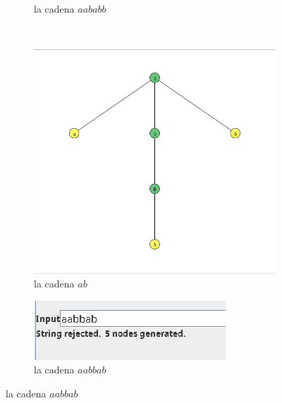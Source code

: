 \documentclass{article}
\begin{document}
\begin{flushleft}
\begin{enumerate}
\begin{figure}[h]
\begin{subfigure}[b]{0.4\textwidth}
                        \caption{la cadena $aababb$}
                        \label{fig:label6}
                    \end{subfigure}
                    \vspace{0.5cm} 
                    \\
                    \begin{subfigure}[b]{0.4\textwidth}
                        \centering
                        \includegraphics[width=\textwidth]{./Imagenes/grafo2.png}
                        \caption{la cadena $ab$}
                        \label{fig:label7}
                    \end{subfigure}
                    \hfill
                    \begin{subfigure}[b]{0.4\textwidth}
                        \centering
                        \includegraphics[width=\textwidth]{./Imagenes/grafo3.png}
                        \caption{la cadena $aabbab$}
                        \label{fig:label8}
                    \end{subfigure}
                    \label{fig:matrix2}
                \end{figure}

            \end{enumerate}
        \end{flushleft}
        
\end{document}
